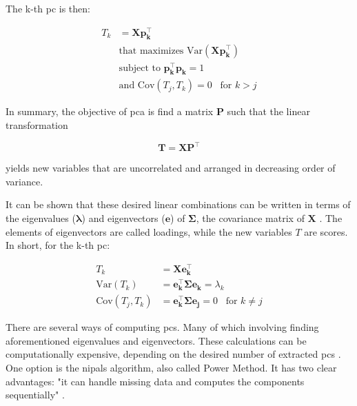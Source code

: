 The k-th \acrshort{pc} is then:

\begin{equation}
	\label{eqn:pca-pck}
	\begin{split}
		T_k & =\mathbf{Xp_k^\intercal} \\
		& \text{that maximizes Var}(\mathbf{Xp_k^\intercal}) \\
		& \text{subject to }  \mathbf{p_k^\intercal p_k} = 1 \\
		& \text{and } \text{Cov}(T_j, T_k) = 0 \;\;\; \text{for } k>j
	\end{split}
\end{equation}

In summary, the objective of \acrshort{pca} is find a matrix $\mathbf{P}$ such that the linear transformation

\begin{equation}
	\label{eqn:pca}
	\mathbf{T=XP^\intercal}
\end{equation}

yields new variables that are uncorrelated and arranged in decreasing order of variance.

It can be shown that these desired linear combinations can be written in terms of the eigenvalues ($\mathbf{\lambda}$) and eigenvectors ($\mathbf{e}$) of $\mathbf{\Sigma}$, the covariance matrix of $\mathbf{X}$ \parencite{johnson2013applied}. The elements of eigenvectors are called loadings, while the new variables $T$ are scores. In short, for the k-th \acrshort{pc}:

\begin{equation}
	\label{eqn:pca-eigen}
	\begin{split}
		T_k & =\mathbf{Xe_k^\intercal} \\
		\text{Var}(T_k)& =  \mathbf{e_k^\intercal \Sigma e_k}=\lambda_k \\
		\text{Cov}(T_j, T_k)& = \mathbf{e_k^\intercal \Sigma e_j}= 0 \;\;\; \text{for } k\neq j
	\end{split}
\end{equation}

There are several ways of computing \acrshort{pc}s. Many of which involving finding aforementioned eigenvalues and eigenvectors. These calculations can be computationally expensive, depending on the desired number of extracted \acrshort{pc}s \parencite{bishop2006pattern}. One option is the \acrfull{nipals} algorithm, also called Power Method. It has two clear advantages: "it can handle missing data and computes the components sequentially" \parencite{dunn2021pid}.

